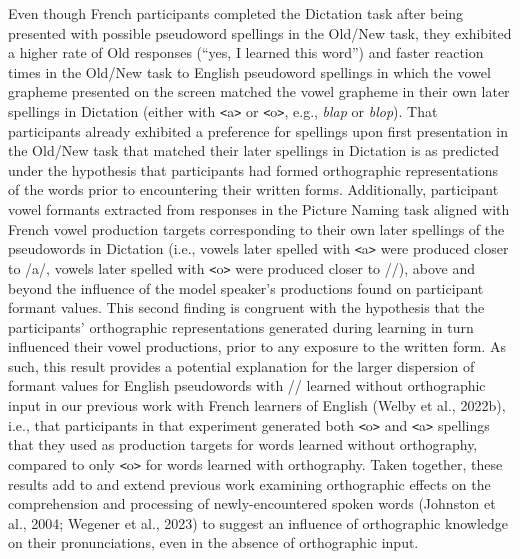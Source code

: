 \documentclass[
  english,
  man,floatsintext]{apa7}
\begin{document}
Even though French participants completed the Dictation task after being presented with possible pseudoword spellings in the Old/New task, they exhibited a higher rate of Old responses (``yes, I learned this word'') and faster reaction times in the Old/New task to English pseudoword spellings in which the vowel grapheme presented on the screen matched the vowel grapheme in their own later spellings in Dictation (either with \texttt{\textless{}}a\texttt{\textgreater{}} or \texttt{\textless{}}o\texttt{\textgreater{}}, e.g., \emph{blap} or \emph{blop}). That participants already exhibited a preference for spellings upon first presentation in the Old/New task that matched their later spellings in Dictation is as predicted under the hypothesis that participants had formed orthographic representations of the words prior to encountering their written forms. Additionally, participant vowel formants extracted from responses in the Picture Naming task aligned with French vowel production targets corresponding to their own later spellings of the pseudowords in Dictation (i.e., vowels later spelled with \texttt{\textless{}}a\texttt{\textgreater{}} were produced closer to /a/, vowels later spelled with \texttt{\textless{}}o\texttt{\textgreater{}} were produced closer to /\textopeno /), above and beyond the influence of the model speaker's productions found on participant formant values. This second finding is congruent with the hypothesis that the participants' orthographic representations generated during learning in turn influenced their vowel productions, prior to any exposure to the written form. As such, this result provides a potential explanation for the larger dispersion of formant values for English pseudowords with /\textscripta / learned without orthographic input in our previous work with French learners of English (Welby et al., 2022b), i.e., that participants in that experiment generated both \texttt{\textless{}}o\texttt{\textgreater{}} and \texttt{\textless{}}a\texttt{\textgreater{}} spellings that they used as production targets for words learned without orthography, compared to only \texttt{\textless{}}o\texttt{\textgreater{}} for words learned with orthography. Taken together, these results add to and extend previous work examining orthographic effects on the comprehension and processing of newly-encountered spoken words (Johnston et al., 2004; Wegener et al., 2023) to suggest an influence of orthographic knowledge on their pronunciations, even in the absence of orthographic input.
\end{document}
